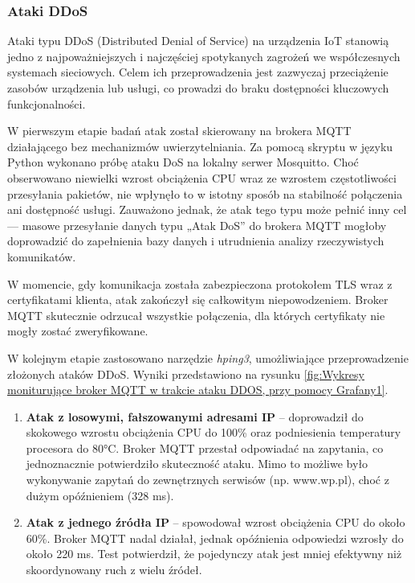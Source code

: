 \subsubsection{Ataki DDoS}
Ataki typu DDoS (Distributed Denial of Service) na urządzenia IoT stanowią jedno z najpoważniejszych i najczęściej spotykanych zagrożeń we współczesnych systemach sieciowych. Celem ich przeprowadzenia jest zazwyczaj przeciążenie zasobów urządzenia lub usługi, co prowadzi do braku dostępności kluczowych funkcjonalności.

W pierwszym etapie badań atak został skierowany na brokera MQTT działającego bez mechanizmów uwierzytelniania. Za pomocą skryptu w języku Python wykonano próbę ataku DoS na lokalny serwer Mosquitto. Choć obserwowano niewielki wzrost obciążenia CPU wraz ze wzrostem częstotliwości przesyłania pakietów, nie wpłynęło to w istotny sposób na stabilność połączenia ani dostępność usługi. Zauważono jednak, że atak tego typu może pełnić inny cel — masowe przesyłanie danych typu „Atak DoS” do brokera MQTT mogłoby doprowadzić do zapełnienia bazy danych i utrudnienia analizy rzeczywistych komunikatów.

W momencie, gdy komunikacja została zabezpieczona protokołem TLS wraz z certyfikatami klienta, atak zakończył się całkowitym niepowodzeniem. Broker MQTT skutecznie odrzucał wszystkie połączenia, dla których certyfikaty nie mogły zostać zweryfikowane.

\medskip
W kolejnym etapie zastosowano narzędzie \textit{hping3}, umożliwiające przeprowadzenie złożonych ataków DDoS. Wyniki przedstawiono na rysunku \ref{fig:Wykresy moniturujące broker MQTT w trakcie ataku DDOS, przy pomocy Grafany1}. 
\begin{enumerate}
    \item \textbf{Atak z losowymi, fałszowanymi adresami IP} – doprowadził do skokowego wzrostu obciążenia CPU do 100\% oraz podniesienia temperatury procesora do 80°C. Broker MQTT przestał odpowiadać na zapytania, co jednoznacznie potwierdziło skuteczność ataku. Mimo to możliwe było wykonywanie zapytań do zewnętrznych serwisów (np. www.wp.pl), choć z dużym opóźnieniem (328 ms).
    \item \textbf{Atak z jednego źródła IP} – spowodował wzrost obciążenia CPU do około 60\%. Broker MQTT nadal działał, jednak opóźnienia odpowiedzi wzrosły do około 220 ms. Test potwierdził, że pojedynczy atak jest mniej efektywny niż skoordynowany ruch z wielu źródeł.
\end{enumerate}

